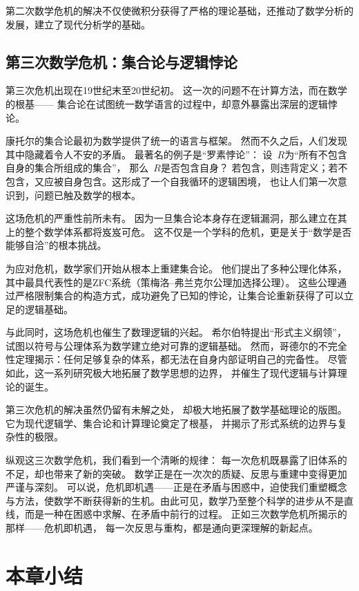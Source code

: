 第二次数学危机的解决不仅使微积分获得了严格的理论基础，还推动了数学分析的发展，建立了现代分析学的基础。

\subsection{第三次数学危机：集合论与逻辑悖论}

第三次危机出现在19世纪末至20世纪初。  
这一次的问题不在计算方法，而在数学的根基——  
集合论在试图统一数学语言的过程中，却意外暴露出深层的逻辑悖论。

康托尔的集合论最初为数学提供了统一的语言与框架。  
然而不久之后，人们发现其中隐藏着令人不安的矛盾。  
最著名的例子是“罗素悖论”：  
设~$R$为“所有不包含自身的集合所组成的集合”，  
那么~$R$是否包含自身？  
若包含，则违背定义；若不包含，又应被自身包含。这形成了一个自我循环的逻辑困境，  
也让人们第一次意识到，问题已触及数学的根本。

这场危机的严重性前所未有。  
因为一旦集合论本身存在逻辑漏洞，那么建立在其上的整个数学体系都将岌岌可危。  
这不仅是一个学科的危机，更是关于“数学是否能够自洽”的根本挑战。

为应对危机，数学家们开始从根本上重建集合论。  
他们提出了多种公理化体系，其中最具代表性的是ZFC系统（策梅洛–弗兰克尔公理加选择公理）。  
这些公理通过严格限制集合的构造方式，成功避免了已知的悖论，让集合论重新获得了可以立足的逻辑基础。

与此同时，这场危机也催生了数理逻辑的兴起。  
希尔伯特提出“形式主义纲领”，试图以符号与公理体系为数学建立绝对可靠的逻辑基础。  
然而，哥德尔的不完全性定理揭示：任何足够复杂的体系，都无法在自身内部证明自己的完备性。    
尽管如此，这一系列研究极大地拓展了数学思想的边界，  
并催生了现代逻辑与计算理论的诞生。

第三次危机的解决虽然仍留有未解之处，  
却极大地拓展了数学基础理论的版图。  
它为现代逻辑学、集合论和计算理论奠定了根基，  
并揭示了形式系统的边界与复杂性的极限。  

纵观这三次数学危机，我们看到一个清晰的规律：  
每一次危机既暴露了旧体系的不足，却也带来了新的突破。  
数学正是在一次次的质疑、反思与重建中变得更加严谨与深刻。  
可以说，危机即机遇——正是在矛盾与困惑中，迫使我们重塑概念与方法，使数学不断获得新的生机。由此可见，数学乃至整个科学的进步从不是直线，而是一种在困惑中求解、在矛盾中前行的过程。
正如三次数学危机所揭示的那样——危机即机遇，  
每一次反思与重构，都是通向更深理解的新起点。

\section{本章小结}

